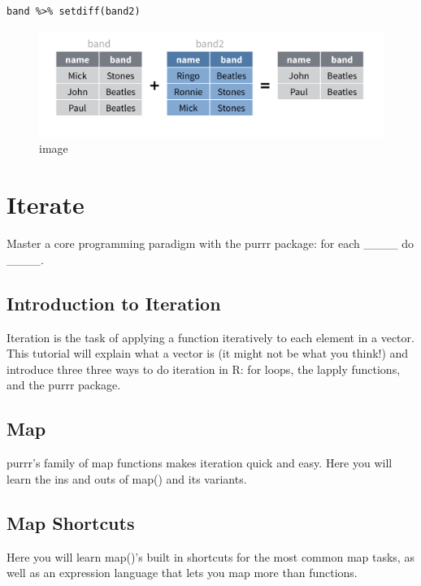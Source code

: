 \documentclass[
]{article}
\begin{document}
\begin{verbatim}
band %>% setdiff(band2)
\end{verbatim}

\begin{figure}
\centering
\includegraphics{data/setdiff.png}
\caption{image}
\end{figure}

\hypertarget{iterate}{%
\section{Iterate}\label{iterate}}

Master a core programming paradigm with the purrr package: for each
\_\_\_\_ do \_\_\_\_.

\hypertarget{introduction-to-iteration}{%
\subsection{Introduction to Iteration}\label{introduction-to-iteration}}

Iteration is the task of applying a function iteratively to each element
in a vector. This tutorial will explain what a vector is (it might not
be what you think!) and introduce three three ways to do iteration in R:
for loops, the lapply functions, and the purrr package.

\hypertarget{map}{%
\subsection{Map}\label{map}}

purrr's family of map functions makes iteration quick and easy. Here you
will learn the ins and outs of map() and its variants.

\hypertarget{map-shortcuts}{%
\subsection{Map Shortcuts}\label{map-shortcuts}}

Here you will learn map()'s built in shortcuts for the most common map
tasks, as well as an expression language that lets you map more than
functions.
\end{document}
